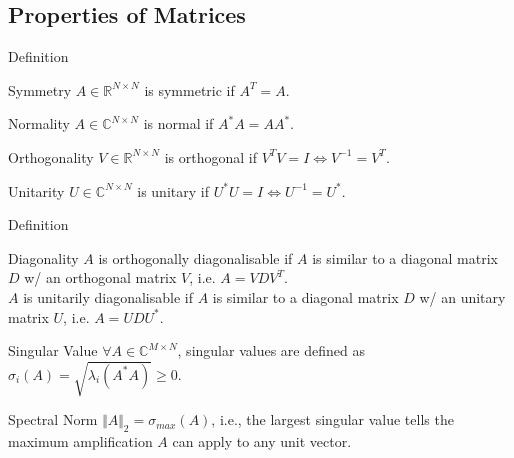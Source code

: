 \documentclass[xcolor=dvipsnames,aspectratio=169]{beamer}
\begin{document}
        \subsection{Properties of Matrices}
            \begin{frame}{Definition}
                \begin{block}{Symmetry}
                    $A \in \mathbb{R}^{N \times N}$ is symmetric if $A^{T} = A$.
                \end{block}
            
                \begin{block}{Normality}
                    $A \in \mathbb{C}^{N \times N}$ is normal if $A^{*}A = AA^{*}$.
                \end{block}

                \begin{block}{Orthogonality}
                    $V \in \mathbb{R}^{N \times N}$ is orthogonal if $V^{T}V = I \iff V^{-1} = V^{T}$.
                \end{block}

                \begin{block}{Unitarity}
                    $U \in \mathbb{C}^{N \times N}$ is unitary if $U^{*}U = I \iff U^{-1} = U^{*}$.
                \end{block}
            \end{frame}

            \begin{frame}{Definition}
                \begin{block}{Diagonality}
                    $A$ is orthogonally diagonalisable if $A$ is similar to a diagonal matrix $D$ w/ an orthogonal matrix $V$, i.e. $A = VDV^{T}$. \\
                    $A$ is unitarily diagonalisable if $A$ is similar to a diagonal matrix $D$ w/ an unitary matrix $U$, i.e. $A = UDU^{*}$.
                \end{block} 

                \begin{block}{Singular Value}
                    $\forall A \in \mathbb{C}^{M \times N}$, singular values are defined as $\sigma_{i} (A) = \sqrt{\lambda_{i} (A^{*} A)} \geq 0$.
                \end{block}

                \begin{block}{Spectral Norm}
                    $\Vert A \Vert_{2} = \sigma_{max} (A)$, i.e., the largest singular value tells the maximum amplification $A$ can apply to any unit vector.
                \end{block}
            \end{frame}
\end{document}

